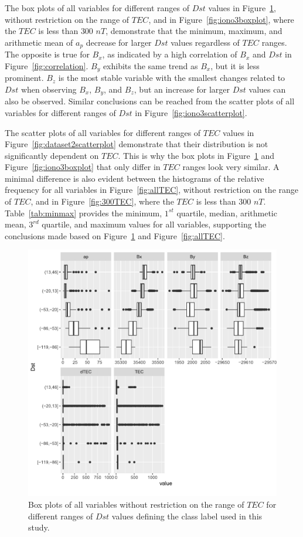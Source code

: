 \documentclass[sn-mathphys-num]{sn-jnl}%
\begin{document}
The box plots of all variables for different ranges of $Dst$ values in Figure~\ref{fig:dataset2boxplot}, without restriction on the range of $TEC$, and in Figure~\ref{fig:iono3boxplot}, where the $TEC$ is less than $300$ $nT$, demonstrate that the minimum, maximum, and arithmetic mean of $a_{p}$ decrease for larger $Dst$ values regardless of $TEC$ ranges. The opposite is true for $B_{x}$, as indicated by a high correlation of $B_{x}$ and $Dst$ in Figure~\ref{fig:correlation}. $B_{y}$ exhibits the same trend as $B_{x}$, but it is less prominent. $B_{z}$ is the most stable variable with the smallest changes related to $Dst$ when observing $B_{x}$, $B_{y}$, and $B_{z}$, but an increase for larger $Dst$ values can also be observed. Similar conclusions can be reached from the scatter plots of all variables for different ranges of $Dst$ in Figure~\ref{fig:iono3scatterplot}. 

The scatter plots of all variables for different ranges of $TEC$ values in Figure~\ref{fig:dataset2scatterplot} demonstrate that their distribution is not significantly dependent on $TEC$. This is why the box plots in Figure~\ref{fig:dataset2boxplot} and Figure~\ref{fig:iono3boxplot} that only differ in $TEC$ ranges look very similar. A minimal difference is also evident between the histograms of the relative frequency for all variables in Figure~\ref{fig:allTEC}, without restriction on the range of $TEC$, and in Figure~\ref{fig:300TEC}, where the $TEC$ is less than $300$ $nT$. Table~\ref{tab:minmax} provides the minimum, $1^{st}$ quartile, median, arithmetic mean, $3^{rd}$ quartile, and maximum values for all variables, supporting the conclusions made based on Figure~\ref{fig:dataset2boxplot} and Figure~\ref{fig:allTEC}.

\begin{figure}
    \centering
    \includegraphics[width=0.9\linewidth]{dataset2boxplot_fix.pdf}
    \caption{Box plots of all variables without restriction on the range of $TEC$ for different ranges of $Dst$ values defining the class label used in this study.}
    \label{fig:dataset2boxplot}
\end{figure}
\end{document}
